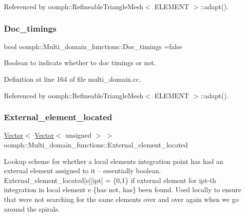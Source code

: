 Referenced by oomph\+::\+Refineable\+Triangle\+Mesh$<$ E\+L\+E\+M\+E\+N\+T $>$\+::adapt().

\mbox{\label{namespaceoomph_1_1Multi__domain__functions_a64dc4667540a9a2591b00635dea88423}} 
\subsubsection{\texorpdfstring{Doc\+\_\+timings}{Doc\_timings}}
{\footnotesize\ttfamily bool oomph\+::\+Multi\+\_\+domain\+\_\+functions\+::\+Doc\+\_\+timings =false}



Boolean to indicate whether to doc timings or not. 



Definition at line 164 of file multi\+\_\+domain.\+cc.



Referenced by oomph\+::\+Refineable\+Triangle\+Mesh$<$ E\+L\+E\+M\+E\+N\+T $>$\+::adapt().

\mbox{\label{namespaceoomph_1_1Multi__domain__functions_a2325d66c90ff388dfd6b2649a48e9827}} 
\subsubsection{\texorpdfstring{External\+\_\+element\+\_\+located}{External\_element\_located}}
{\footnotesize\ttfamily \hyperlink{classoomph_1_1Vector}{Vector}$<$ \hyperlink{classoomph_1_1Vector}{Vector}$<$ unsigned $>$ $>$ oomph\+::\+Multi\+\_\+domain\+\_\+functions\+::\+External\+\_\+element\+\_\+located}



Lookup scheme for whether a local element\textquotesingle{}s integration point has had an external element assigned to it -- essentially boolean. External\+\_\+element\+\_\+located\mbox{[}e\mbox{]}\mbox{[}ipt\mbox{]} = \{0,1\} if external element for ipt-\/th integration in local element e \{has not, has\} been found. Used locally to ensure that we\textquotesingle{}re not searching for the same elements over and over again when we go around the spirals. 



